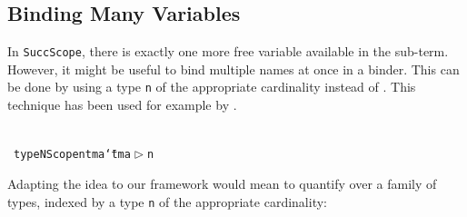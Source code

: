 \documentclass[9pt,authoryear]{sigplanconf}
\begin{document}
\subsection{Binding Many Variables}

%
    In \texttt{SuccScope}, there is exactly one more free variable available in the sub-term.
    However, it might be useful to bind multiple names at once in a binder. This can 
    be done by using a type \texttt{n} of the appropriate cardinality instead of \texttt{\makebox[1.22ex][l]{$ {(} $}}\texttt{\makebox[1.22ex][r]{$ {)} $}}.
    This technique has been used for example by \citet{bound-kmett-12}.%


{\nopagebreak }

%
%
%
~\\~\vphantom{$\{$}\texttt{type}\texttt{\mbox{\hspace{0.50em}}}\texttt{NScope}\texttt{\mbox{\hspace{0.50em}}}\texttt{n}\texttt{\mbox{\hspace{0.50em}}}\texttt{tm}\texttt{\mbox{\hspace{0.50em}}}\texttt{a}\texttt{\mbox{\hspace{0.50em}}}\texttt{{\char `\=}}\texttt{\mbox{\hspace{0.50em}}}\texttt{tm}\texttt{\mbox{\hspace{0.50em}}}\texttt{\makebox[1.22ex][l]{$ {(} $}}\texttt{a}\texttt{\mbox{\hspace{0.50em}}}\texttt{$ \vartriangleright $}\texttt{\mbox{\hspace{0.50em}}}\texttt{n}\texttt{\makebox[1.22ex][r]{$ {)} $}}\texttt{{\nopagebreak \newline%
}\vphantom{$\{$}}%


%
Adapting the idea to our framework would mean to quantify over a family of types,
    indexed by a type \texttt{n} of the appropriate cardinality{:}%


%
%


{\nopagebreak }
\end{document}

